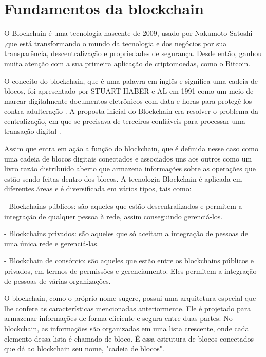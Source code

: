 \chapter{Fundamentos da blockchain}
\label{chapter_fondamentos}


    O Blockchain é uma tecnologia nascente de 2009, usado por Nakamoto Satoshi \cite{Blockchain-Satochi},que está transformando o mundo da tecnologia e dos negócios por sua transparência, descentralização e propriedades de segurança. Desde então, ganhou muita atenção com a sua primeira aplicação de criptomoedas, como o Bitcoin.
    
    O conceito do blockchain, que é uma palavra em inglês e significa uma cadeia de blocos, foi apresentado por STUART HABER e AL em 1991 como um meio de marcar digitalmente documentos eletrônicos com data e horas para protegê-los contra adulteração \cite{anderson2020security}. A proposta inicial do Blockchain era resolver o problema da centralização, em que se precisava de terceiros confiáveis para processar uma transação digital \cite{9402747}.

    Assim que entra em ação a função do blockchain, que é definida nesse caso como uma cadeia de blocos digitais conectados e associados uns aos outros como um livro razão distribuído aberto que armazena informações sobre as operações que estão sendo feitas dentro dos blocos. A tecnologia Blockchain é aplicada em diferentes áreas e é diversificada em vários tipos, tais como:

        - Blockchains públicos: são aqueles que estão descentralizados e permitem a integração de qualquer pessoa à rede, assim conseguindo gerenciá-los.

        - Blockchains privados: são aqueles que só aceitam a integração de pessoas de uma única rede e gerenciá-las.

        - Blockchain de consórcio: são aqueles que estão entre os blockchains públicos e privados, em termos de permissões e gerenciamento. Eles permitem a integração de pessoas de várias organizações.

    O blockchain, como o próprio nome sugere, possui uma arquitetura especial que lhe confere as características mencionadas anteriormente. Ele é projetado para armazenar informações de forma eficiente e segura entre duas partes. No blockchain, as informações são organizadas em uma lista crescente, onde cada elemento dessa lista é chamado de bloco. É essa estrutura de blocos conectados que dá ao blockchain seu nome, "cadeia de blocos".\cite{9402747}

